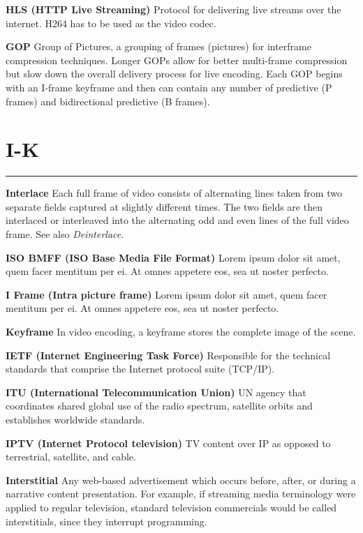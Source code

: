 \smallskip
\textbf{HLS (HTTP Live Streaming)}
Protocol for delivering live streams over the internet.
H264 has to be used as the video codec.



\smallskip
\textbf{GOP}
Group of Pictures, a grouping of frames (pictures) for interframe compression techniques. Longer GOPs allow for better multi-frame compression but slow down the overall delivery process for live encoding. Each GOP begins with an I-frame keyframe and then can contain any number of predictive (P frames) and bidirectional predictive (B frames).


\section{I-K}
\hrule

\medskip
\textbf{Interlace}
Each full frame of video consists of alternating lines taken from two separate fields captured at slightly different times. The two fields are then interlaced or interleaved into the alternating odd and even lines of the full video frame.  See also \textit{Deinterlace}.

\smallskip
\textbf{ISO BMFF (ISO Base Media File Format)}
Lorem ipsum dolor sit amet, quem facer mentitum per ei. At omnes appetere eos, sea ut noster perfecto.

\smallskip
\textbf{I Frame (Intra picture frame)}
Lorem ipsum dolor sit amet, quem facer mentitum per ei. At omnes appetere eos, sea ut noster perfecto.

\smallskip
\textbf{Keyframe}
In video encoding, a keyframe stores the complete image of the scene.

\smallskip
\textbf{IETF (Internet Engineering Task Force)}
Responsible for the technical standards that comprise the Internet protocol suite (TCP/IP).

\smallskip
\textbf{ITU (International Telecommunication Union)}
UN agency that coordinates shared global use of the radio spectrum, satellite orbits and establishes worldwide standards.

\medskip
\textbf{IPTV (Internet Protocol television)}
TV content over IP as opposed to terrestrial, satellite, and cable.

\smallskip
\textbf{Interstitial}
Any web-based advertisement which occurs before, after, or during a narrative content presentation. For example, if streaming media terminology were applied to regular television, standard television commercials would be called interstitials, since they interrupt programming.

